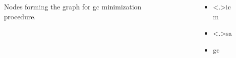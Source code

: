 \begin{frame}
\begin{columns}
\begin{column}{.6\textwidth}
\begin{figure}
\begin{tikzpicture}[y=0.80pt,x=0.80pt,yscale=-1, inner sep=0pt, outer sep=0pt]
 
  
\end{tikzpicture}  
\caption{Nodes forming the graph for \ac{gc} minimization procedure.}
\end{figure}
\end{column}
\begin{column}{1cm}
\end{column}
\begin{column}{.4\textwidth}
		\begin{itemize}
		\item <.>\acf{icm}		
		\item <.>\acf{sa}
		\item  \acf{gc}
		\end{itemize}
\end{column}
\end{columns}
\end{frame}


